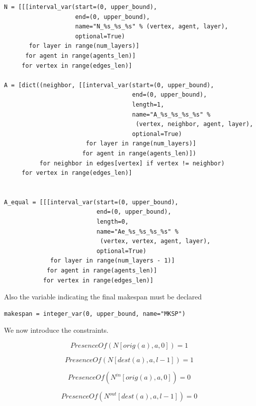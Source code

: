 \documentclass[12pt, a4paper, hidelinks]{article}
\numberwithin{equation}{section}
\begin{document}
\begin{lstlisting}[label={lst:variables2}]
N = [[[interval_var(start=(0, upper_bound),
                    end=(0, upper_bound),
                    name="N_%s_%s_%s" % (vertex, agent, layer),
                    optional=True)
       for layer in range(num_layers)]
      for agent in range(agents_len)]
     for vertex in range(edges_len)]

A = [dict((neighbor, [[interval_var(start=(0, upper_bound),
                                    end=(0, upper_bound),
                                    length=1,
                                    name="A_%s_%s_%s_%s" %
                                     (vertex, neighbor, agent, layer),
                                    optional=True)
                       for layer in range(num_layers)]
                      for agent in range(agents_len)])
          for neighbor in edges[vertex] if vertex != neighbor)
     for vertex in range(edges_len)]


A_equal = [[[interval_var(start=(0, upper_bound),
                          end=(0, upper_bound),
                          length=0,
                          name="Ae_%s_%s_%s_%s" %
                           (vertex, vertex, agent, layer),
                          optional=True)
             for layer in range(num_layers - 1)]
            for agent in range(agents_len)]
           for vertex in range(edges_len)]
\end{lstlisting}

Also the variable indicating the final makespan must be declared
\begin{lstlisting}[label={lst:variablesmakespan}]
makespan = integer_var(0, upper_bound, name="MKSP")
\end{lstlisting}

We now introduce the constraints.
\begin{description}\label{eq:equation_set_2.1}
\item \begin{equation} PresenceOf(N[orig(a),a,0]) = 1 \label{eq:2.1}\end{equation}
\item \begin{equation} PresenceOf(N[dest(a),a,l-1]) = 1 \label{eq:2.2}\end{equation}
\item \begin{equation} PresenceOf(N^{in}[orig(a),a,0]) = 0 \label{eq:2.3}\end{equation}
\item \begin{equation} PresenceOf(N^{out}[dest(a),a,l-1]) = 0 \label{eq:2.4}\end{equation}
\end{description}
\end{document}
